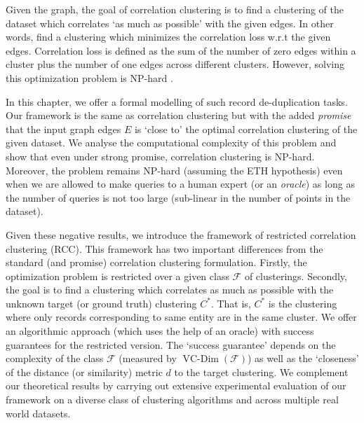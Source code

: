 \documentclass[12pt]{article}
\newcommand{\mc}{\mathcal}
\DeclareMathOperator*{\vcdim}{VC-Dim}
\begin{document}
Given the graph, the goal of correlation clustering is to find a clustering of the dataset which correlates `as much as possible' with the given edges. In other words, find a clustering which minimizes the correlation loss w.r.t the given edges. Correlation loss is defined as the sum of the number of zero edges within a cluster plus the number of one edges across different clusters. However, solving this optimization problem is NP-hard \cite{bansal2004correlation}. 
  
In this chapter, we offer a formal modelling of such record de-duplication tasks. Our framework is the same as correlation clustering but with the added \textit{promise} that the input graph edges $E$ is `close to' the optimal correlation clustering of the given dataset. We analyse the computational complexity of this problem and show that even under strong promise, correlation clustering is NP-hard. Moreover, the problem remains NP-hard (assuming the ETH hypothesis) even when we are allowed to make queries to a human expert (or an \textit{oracle}) as long as the number of queries is not too large (sub-linear in the number of points in the dataset). 

Given these negative results, we introduce the framework of restricted correlation clustering (RCC). This framework has two important differences from the standard (and promise) correlation clustering formulation. Firstly, the optimization problem is restricted over a given class $\mc F$ of clusterings. Secondly, the goal is to find a clustering which correlates as much as possible with the unknown target (or ground truth) clustering $C^*$. That is, $C^*$ is the clustering where only records corresponding to same entity are in the same cluster. We offer an algorithmic approach (which uses the help of an oracle) with success guarantees for the restricted version. The `success guarantee' depends on the complexity of the class $\mc F$ (measured by $\vcdim(\mc F)$) as well as the `closeness' of the distance (or similarity) metric $d$ to the target clustering. We complement our theoretical results by carrying out extensive experimental evaluation of our framework on a diverse class of clustering algorithms and across multiple real world datasets.
\end{document}
